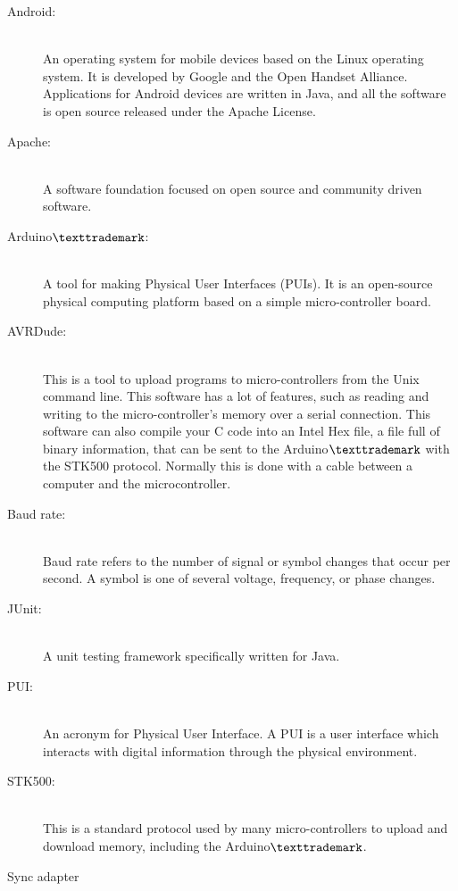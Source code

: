 \begin{description}
	\item[Android:]\hfill \\
		An operating system for mobile devices based on the Linux operating system. It is developed by Google and the Open Handset Alliance. Applications for Android devices are written in Java, and all the software is open source released under the Apache License.
	\item[Apache:] \hfill \\
		A software foundation focused on open source and community driven software.
	\item[Arduino$\texttrademark$:]\hfill \\
		A tool for making Physical User Interfaces (PUIs). It is an open-source physical computing platform based on a simple micro-controller board.
	\item[AVRDude:]\hfill \\
		This is a tool to upload programs to micro-controllers from the Unix command line. This software has a lot of features, such as reading and writing to the micro-controller's memory over a serial connection. This software can also compile your C code into an Intel Hex file, a file full of binary information, that can be sent to the Arduino$\texttrademark$ with the STK500 protocol. Normally this is done with a cable between a computer and the microcontroller.
	\item[Baud rate:]\hfill \\
		Baud rate refers to the number of signal or symbol changes that occur per second. A symbol is one of several voltage, frequency, or phase changes. \cite{baudrate}
	\item[JUnit:]\hfill \\
		A unit testing framework specifically written for Java.
	\item[PUI:]\hfill \\
		An acronym for Physical User Interface. A PUI is a user interface which interacts with digital information through the physical environment.
	\item[STK500:]\hfill \\
		This is a standard protocol used by many micro-controllers to upload and download memory, including the Arduino$\texttrademark$.
	\item[Sync adapter]\hfill \\
\end{description}
